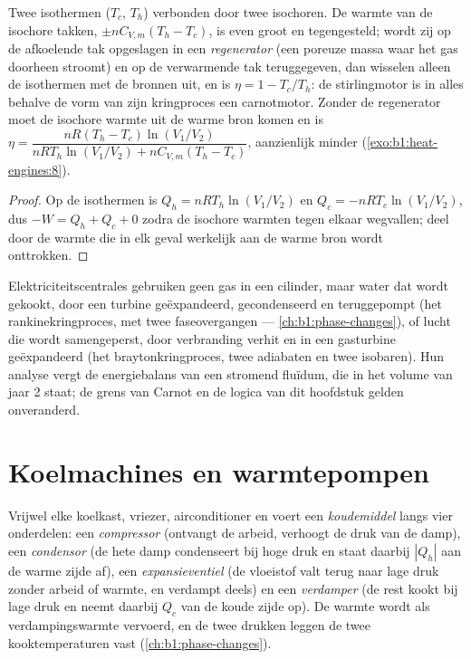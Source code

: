 \begin{proposition}\label{prop:b1:heat-engines:stirling}
Twee isothermen ($T_c$, $T_h$) verbonden door twee isochoren. De warmte van de
isochore takken, $\pm nC_{V,m}(T_h - T_c)$, is even groot en tegengesteld; wordt zij
op de afkoelende tak opgeslagen in een \emph{regenerator} (een poreuze massa waar
het gas doorheen stroomt) en op de verwarmende tak teruggegeven, dan wisselen alleen de isothermen
met de bronnen uit, en is $\eta = 1 - T_c/T_h$: de stirlingmotor
is in alles behalve de vorm van zijn kringproces een carnotmotor. Zonder de
regenerator moet de isochore warmte uit de warme bron komen en is
$\eta = \dfrac{nR(T_h - T_c)\ln(V_1/V_2)}{nRT_h\ln(V_1/V_2) + nC_{V,m}(T_h - T_c)}$,
aanzienlijk minder (\cref{exo:b1:heat-engines:8}).
\end{proposition}

\begin{proof}
Op de isothermen is $Q_h = nRT_h\ln(V_1/V_2)$ en $Q_c = -nRT_c\ln(V_1/V_2)$, dus
$-W = Q_h + Q_c + 0$ zodra de isochore warmten tegen elkaar wegvallen; deel door de warmte
die in elk geval werkelijk aan de warme bron wordt onttrokken.
\end{proof}

\begin{remark}\label{rem:b1:heat-engines:turbines}
Elektriciteitscentrales gebruiken geen gas in een cilinder, maar water dat wordt gekookt,
door een turbine geëxpandeerd, gecondenseerd en teruggepompt (het
rankinekringproces, met twee faseovergangen --- \cref{ch:b1:phase-changes}), of lucht
die wordt samengeperst, door verbranding verhit en in een gasturbine geëxpandeerd (het
braytonkringproces, twee adiabaten en twee isobaren). Hun analyse vergt de
energiebalans van een stromend fluïdum, die in het volume van jaar 2 staat; de
grens van Carnot en de logica van dit hoofdstuk gelden onveranderd.
\end{remark}

\section{Koelmachines en warmtepompen}

\begin{definition}[Dampcompressiekringproces]\label{def:b1:heat-engines:vapourcycle}
Vrijwel elke koelkast, vriezer, airconditioner en  voert
een \emph{koudemiddel} langs vier onderdelen: een \emph{compressor}
(ontvangt de arbeid, verhoogt de druk van de damp), een
\emph{condensor} (de hete damp condenseert bij hoge druk en staat daarbij
$|Q_h|$ aan de warme zijde af), een \emph{expansieventiel} (de vloeistof valt terug naar
lage druk zonder arbeid of warmte, en verdampt deels) en een
\emph{verdamper} (de rest kookt bij lage druk en neemt daarbij $Q_c$ van
de koude zijde op). De warmte wordt als verdampingswarmte vervoerd, en
de twee drukken leggen de twee kooktemperaturen vast
(\cref{ch:b1:phase-changes}).
\end{definition}

